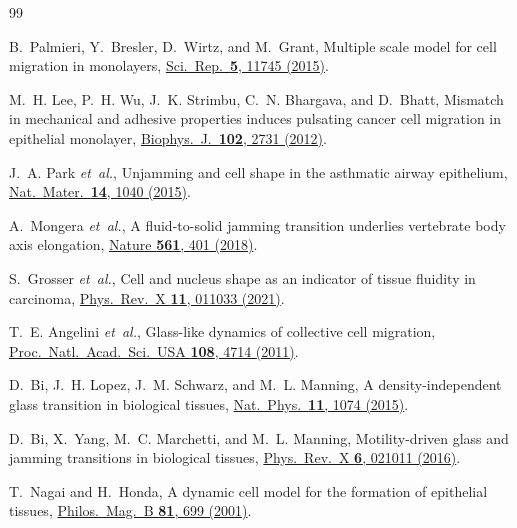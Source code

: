 \documentclass[aps,pre,twocolumn,superscriptaddress,longbibliography,floatfix]{revtex4-2}
\begin{document}
\begin{thebibliography}{99}

B.~Palmieri, Y.~Bresler, D.~Wirtz, and M.~Grant,
Multiple scale model for cell migration in monolayers,
\href{https://doi.org/10.1038/srep11745}{Sci.\ Rep.\ \textbf{5}, 11745
(2015)}.

M.~H. Lee, P.~H. Wu, J.~K. Strimbu, C.~N. Bhargava, and D.~Bhatt,
Mismatch in mechanical and adhesive properties induces
pulsating cancer cell migration in epithelial monolayer,
\href{https://doi.org/10.1016/j.bpj.2012.03.027}{Biophys.\ J.\
\textbf{102}, 2731 (2012)}.

J.~A. Park \textit{et~al.},
Unjamming and cell shape in the asthmatic airway epithelium,
\href{https://doi.org/10.1038/nmat4357}{Nat.\ Mater.\ \textbf{14}, 1040
(2015)}.

A.~Mongera \textit{et~al.},
A fluid-to-solid jamming transition underlies vertebrate body axis
elongation,
\href{https://doi.org/10.1038/s41586-018-0479-2}{Nature \textbf{561}, 401
(2018)}.

S.~Grosser \textit{et~al.},
Cell and nucleus shape as an indicator of tissue fluidity in carcinoma,
\href{https://doi.org/10.1103/PhysRevX.11.011033}{Phys.\ Rev.\ X
\textbf{11}, 011033 (2021)}.

T.~E. Angelini \textit{et~al.},
Glass-like dynamics of collective cell migration,
\href{https://doi.org/10.1073/pnas.1010059108}{Proc.\ Natl.\ Acad.\ Sci.\
USA \textbf{108}, 4714 (2011)}.

D.~Bi, J.~H. Lopez, J.~M. Schwarz, and M.~L. Manning,
A density-independent glass transition in biological tissues,
\href{https://doi.org/10.1038/nphys3471}{Nat.\ Phys.\ \textbf{11}, 1074
(2015)}.

D.~Bi, X.~Yang, M.~C. Marchetti, and M.~L. Manning,
Motility-driven glass and jamming transitions in biological tissues,
\href{https://doi.org/10.1103/PhysRevX.6.021011}{Phys.\ Rev.\ X
\textbf{6}, 021011 (2016)}.

T.~Nagai and H.~Honda,
A dynamic cell model for the formation of epithelial tissues,
\href{https://doi.org/10.1080/13642810108205772}{Philos.\ Mag.\ B
\textbf{81}, 699 (2001)}.


\end{thebibliography}
\end{document}
